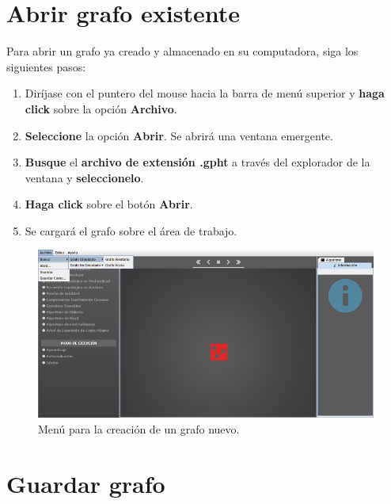 \documentclass{book}
\begin{document}
\section{Abrir grafo existente}

Para abrir un grafo ya creado y almacenado en su computadora, siga los siguientes pasos:
\medskip

\begin{enumerate}
	\itemsep=8pt \topsep=0pt \partopsep=0pt \parskip=0pt \parsep=0pt

	\item Diríjase con el puntero del mouse hacia la barra de menú superior y \textbf{haga click} sobre la opción \textbf{Archivo}.

	\item \textbf{Seleccione} la opción \textbf{Abrir}. Se abrirá una ventana emergente.

	\item \textbf{Busque} el \textbf{archivo de extensión .gpht} a través del explorador de la ventana y \textbf{seleccionelo}.

	\item \textbf{Haga click} sobre el botón \textbf{Abrir}.

	\item Se cargará el grafo sobre el área de trabajo.

\end{enumerate}
\medskip


\begin{figure}[H]
	\centering
	\includegraphics[width=1.0\textwidth]{images/ventanas/02.png}
	\medskip
	\caption{Menú para la creación de un grafo nuevo.}
\end{figure}
\bigskip



\section{Guardar grafo}
\end{document}

